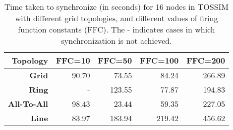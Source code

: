 \begin{table}
\centering
\caption{Time taken to synchronize (in seconds) for 16 nodes in TOSSIM with different grid topologies, and different values of firing function constants (FFC). The - indicates cases in which synchronization is not achieved.} 
\label{tab:topologyFFC}
\vspace{2pt}
\begin{tabular}{|r|r|r|r|r|} \hline
Topology                & {\bf FFC=10}  & {\bf FFC=50} & {\bf FFC=100} &   {\bf FFC=200}  \\ \hline
{\bf Grid}              &   90.70    &   73.55     &   84.24        &   266.89      \\ 
{\bf Ring}              &   -        &  123.55     &   77.87        &   194.83      \\ 
{\bf All-To-All}        &   98.43    &   23.44     &   59.35        &   227.05      \\ 
{\bf Line}              &   83.97    &   183.94    &   219.42       &   456.62      \\ \hline
\end{tabular}
\end{table}
